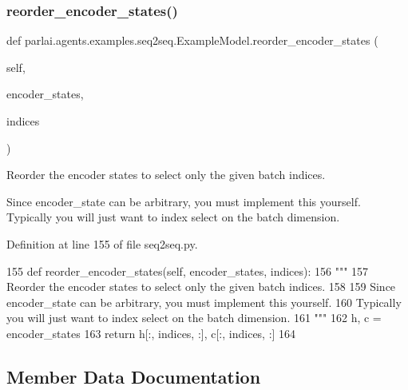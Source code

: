 \subsubsection{\texorpdfstring{reorder\+\_\+encoder\+\_\+states()}{reorder\_encoder\_states()}}
{\footnotesize\ttfamily def parlai.\+agents.\+examples.\+seq2seq.\+Example\+Model.\+reorder\+\_\+encoder\+\_\+states (\begin{DoxyParamCaption}\item[{}]{self,  }\item[{}]{encoder\+\_\+states,  }\item[{}]{indices }\end{DoxyParamCaption})}

\begin{DoxyVerb}Reorder the encoder states to select only the given batch indices.

Since encoder_state can be arbitrary, you must implement this yourself.
Typically you will just want to index select on the batch dimension.
\end{DoxyVerb}
 

Definition at line 155 of file seq2seq.\+py.


\begin{DoxyCode}
155     \textcolor{keyword}{def }reorder\_encoder\_states(self, encoder\_states, indices):
156         \textcolor{stringliteral}{"""}
157 \textcolor{stringliteral}{        Reorder the encoder states to select only the given batch indices.}
158 \textcolor{stringliteral}{}
159 \textcolor{stringliteral}{        Since encoder\_state can be arbitrary, you must implement this yourself.}
160 \textcolor{stringliteral}{        Typically you will just want to index select on the batch dimension.}
161 \textcolor{stringliteral}{        """}
162         h, c = encoder\_states
163         \textcolor{keywordflow}{return} h[:, indices, :], c[:, indices, :]
164 
\end{DoxyCode}


\subsection{Member Data Documentation}
\mbox{\label{classparlai_1_1agents_1_1examples_1_1seq2seq_1_1ExampleModel_a52e8840bc136b8355566d7af8f2f2fa3}} 
